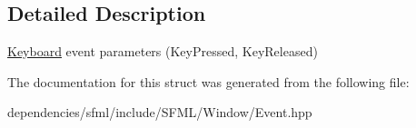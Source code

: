 \subsection{Detailed Description}
\hyperlink{classsf_1_1_keyboard}{Keyboard} event parameters (Key\+Pressed, Key\+Released) 

The documentation for this struct was generated from the following file\+:\begin{DoxyCompactItemize}
\item 
dependencies/sfml/include/\+S\+F\+M\+L/\+Window/Event.\+hpp\end{DoxyCompactItemize}
